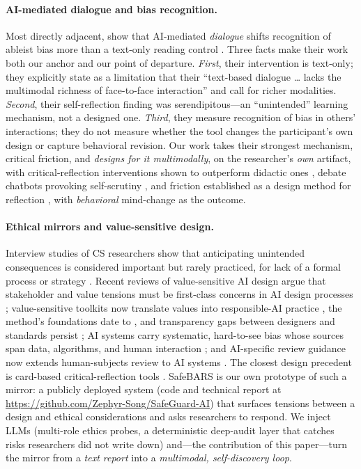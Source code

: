 \documentclass[sigconf,screen]{acmart}
\begin{document}
\paragraph{AI-mediated dialogue and bias recognition.}
Most directly adjacent, \citeauthor{taheri26} show that AI-mediated
\emph{dialogue} shifts recognition of ableist bias more than a text-only
reading control \citep{taheri26}. Three facts make their work both our anchor
and our point of departure. \emph{First}, their intervention is text-only; they
explicitly state as a limitation that their ``text-based dialogue \ldots
lacks the multimodal richness of face-to-face interaction'' and call for richer
modalities. \emph{Second}, their self-reflection finding was serendipitous---an
``unintended'' learning mechanism, not a designed one. \emph{Third}, they
measure recognition of bias in others' interactions; they do not measure
whether the tool changes the participant's own design or capture behavioral
revision. Our work takes their strongest mechanism, critical friction, and
\emph{designs for it multimodally}, on the researcher's \emph{own} artifact, with critical-reflection interventions shown to outperform didactic ones \citep{lee2023criticalreflection}, debate chatbots provoking self-scrutiny \citep{tanprasert2024debate}, and friction established as a design method for reflection \citep{benedetti2023friction},
with \emph{behavioral} mind-change as the outcome.

\paragraph{Ethical mirrors and value-sensitive design.}
Interview studies of CS researchers show that anticipating unintended
consequences is considered important but rarely practiced, for lack of a
formal process or strategy \citep{do2023}. Recent reviews of value-sensitive
AI design argue that stakeholder and value tensions must be first-class
concerns in AI design processes \citep{sadek2023}; value-sensitive toolkits now translate values into responsible-AI practice \citep{sadek2024vsdtoolkit}, the method's foundations date to \citep{friedman2008vsd}, and transparency gaps between designers and standards persist \citep{schor2024gap}; AI systems carry systematic,
hard-to-see bias whose sources span data, algorithms, and human interaction
\citep{ferrara2024}; and AI-specific review guidance now extends
human-subjects review to AI systems \citep{makridis2023}. The closest design precedent is card-based critical-reflection tools
\citep{elsayedali2023ric}. SafeBARS is our own
prototype of such a mirror: a publicly deployed system (code and technical
report at \url{https://github.com/Zephyr-Song/SafeGuard-AI}) that surfaces
tensions between a design and ethical considerations and asks researchers to
respond. We inject LLMs (multi-role ethics probes, a deterministic deep-audit
layer that catches risks researchers did not write down) and---the contribution
of this paper---turn the mirror from a \emph{text report} into a
\emph{multimodal, self-discovery loop}.
\end{document}
